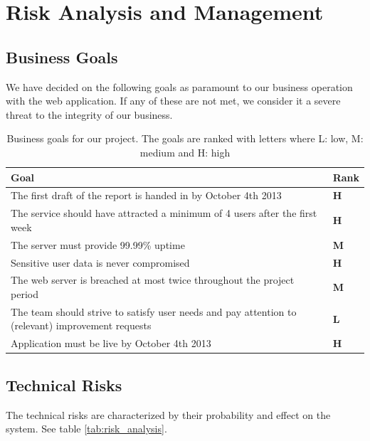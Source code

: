 \documentclass[a4paper]{article}
\begin{document}
\section{Risk Analysis and Management}


\subsection{Business Goals}
We have decided on the following goals as paramount to our business operation with the web application. If any of these are not met, we consider it a severe threat to the integrity of our business.

\begin{table}[h]
	\begin{tabular}{|p{10cm}|l|}
		\hline
		\textbf{Goal} & \textbf{Rank} \\ \hline
        The first draft of the report is handed in by October 4th 2013 & \textbf{H} \\ \hline
The service should have attracted a minimum of 4 users after the first week & \textbf{H} \\ \hline
The server must provide 99.99\% uptime   & \textbf{M} \\ \hline
Sensitive user data is never compromised & \textbf{H} \\ \hline
The web server is breached at most twice throughout the project period &  \textbf{M} \\ \hline
The team should strive to satisfy user needs and pay attention to (relevant) improvement requests & \textbf{L} \\ \hline
Application must be live by October 4th 2013 &	\textbf{H}\\ \hline
	\end{tabular}
	\caption{Business goals for our project. The goals are ranked with letters where L: low, M: medium and H: high}
	\label{tab:business_goals}
\end{table}

\subsection{Technical Risks}
The technical risks are characterized by their probability and effect on the system. See table \ref{tab:risk_analysis}.
\end{document}
